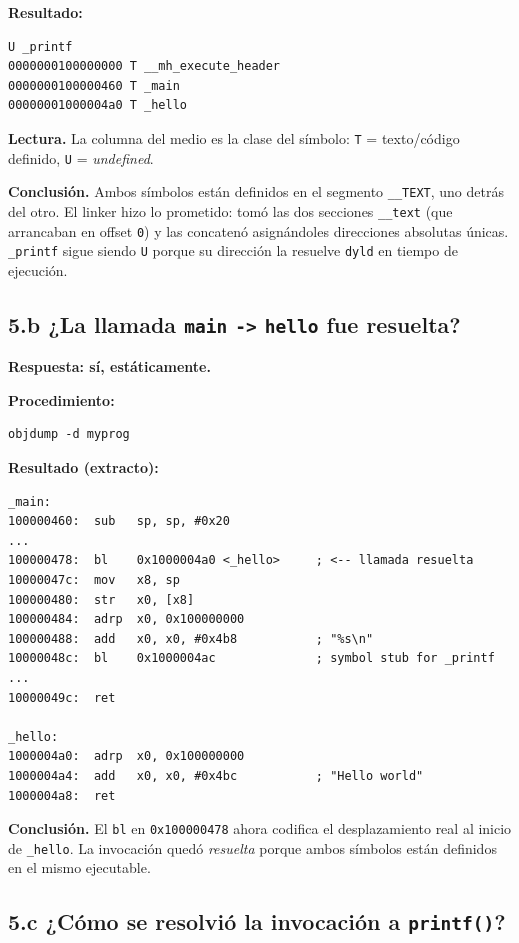 \documentclass[11pt,a4paper]{article}
\begin{document}
\textbf{Resultado:}

\begin{lstlisting}[style=outstyle]
                 U _printf
0000000100000000 T __mh_execute_header
0000000100000460 T _main
00000001000004a0 T _hello
\end{lstlisting}

\textbf{Lectura.} La columna del medio es la clase del símbolo:
\texttt{T} = texto/código definido, \texttt{U} = \emph{undefined}.

\textbf{Conclusión.} Ambos símbolos están definidos en el segmento
\texttt{\_\_TEXT}, uno detrás del otro. El linker hizo lo prometido:
tomó las dos secciones \texttt{\_\_text} (que arrancaban en offset
\texttt{0}) y las concatenó asignándoles direcciones absolutas
únicas. \texttt{\_printf} sigue siendo \texttt{U} porque su dirección
la resuelve \texttt{dyld} en tiempo de ejecución.

\subsection*{5.b ¿La llamada \texttt{main} \texttt{->} \texttt{hello} fue resuelta?}

\textbf{Respuesta: sí, estáticamente.}

\textbf{Procedimiento:}

\begin{lstlisting}
objdump -d myprog
\end{lstlisting}

\textbf{Resultado (extracto):}

\begin{lstlisting}[style=asmstyle]
_main:
100000460:  sub   sp, sp, #0x20
...
100000478:  bl    0x1000004a0 <_hello>     ; <-- llamada resuelta
10000047c:  mov   x8, sp
100000480:  str   x0, [x8]
100000484:  adrp  x0, 0x100000000
100000488:  add   x0, x0, #0x4b8           ; "%s\n"
10000048c:  bl    0x1000004ac              ; symbol stub for _printf
...
10000049c:  ret

_hello:
1000004a0:  adrp  x0, 0x100000000
1000004a4:  add   x0, x0, #0x4bc           ; "Hello world"
1000004a8:  ret
\end{lstlisting}

\textbf{Conclusión.} El \texttt{bl} en \texttt{0x100000478} ahora
codifica el desplazamiento real al inicio de \texttt{\_hello}. La
invocación quedó \emph{resuelta} porque ambos símbolos están definidos
en el mismo ejecutable.

\subsection*{5.c ¿Cómo se resolvió la invocación a \texttt{printf()}?}
\end{document}
